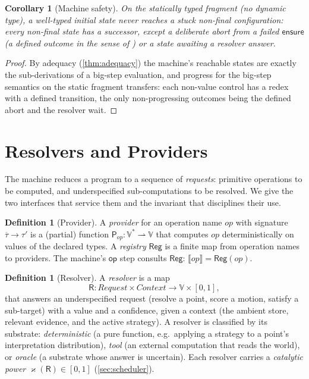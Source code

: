 \documentclass[11pt,a4paper]{article}
\theoremstyle{plain}
\newtheorem{corollary}[theorem]{Corollary}
\theoremstyle{definition}
\newtheorem{definition}[theorem]{Definition}
\theoremstyle{remark}
\newcommand{\Unit}{[0,1]}
\newcommand{\Val}{\mathbb{V}}
\newcommand{\sem}[1]{\llbracket #1 \rrbracket}
\newcommand{\catp}{\varkappa}              %
\newcommand{\Res}{\mathsf{R}}              %
\newcommand{\Prov}{\mathsf{P}}             %
\newcommand{\reg}{\mathsf{Reg}}            %
\begin{document}
\begin{corollary}[Machine safety]
\label{cor:machinesafety}
On the statically typed fragment (no dynamic type), a well-typed initial state
never reaches a stuck non-final configuration: every non-final state has a
successor, except a deliberate abort from a failed $\mathsf{ensure}$ (a defined
outcome in the sense of \citet{hoare1969}) or a state awaiting a resolver
answer.
\end{corollary}
\begin{proof}
By adequacy (\cref{thm:adequacy}) the machine's reachable states are exactly the
sub-derivations of a big-step evaluation, and progress for the big-step
semantics on the static fragment \citep{wright1994,pierce2002} transfers: each
non-value control has a redex with a defined transition, the only non-progressing
outcomes being the defined abort and the resolver wait.
\end{proof}

\section{Resolvers and Providers}
\label{sec:resolvers}

The machine reduces a program to a sequence of \emph{requests}: primitive
operations to be computed, and underspecified sub-computations to be resolved.
We give the two interfaces that service them and the invariant that disciplines
their use.

\begin{definition}[Provider]
\label{def:provider}
A \emph{provider} for an operation name $op$ with signature
$\overline{\tau}\to\tau'$ is a (partial) function
$\Prov_{op}\colon\Val^{*}\rightharpoonup\Val$ that computes $op$ deterministically
on values of the declared types. A \emph{registry} $\reg$ is a finite map from
operation names to providers. The machine's $\mathsf{op}$ step consults $\reg$:
$\sem{op}=\reg(op)$.
\end{definition}

\begin{definition}[Resolver]
\label{def:resolver}
A \emph{resolver} is a map
\[
\Res\colon \mathit{Request}\times\mathit{Context}\longrightarrow
\Val\times\Unit,
\]
that answers an underspecified request (resolve a point, score a motion, satisfy
a sub-target) with a value and a confidence, given a context (the ambient store,
relevant evidence, and the active strategy). A resolver is classified by its
substrate: \emph{deterministic} (a pure function, e.g.\ applying a strategy to a
point's interpretation distribution), \emph{tool} (an external computation that
reads the world), or \emph{oracle} (a substrate whose answer is uncertain). Each
resolver carries a \emph{catalytic power} $\catp(\Res)\in\Unit$
(\cref{sec:scheduler}).
\end{definition}
\end{document}

